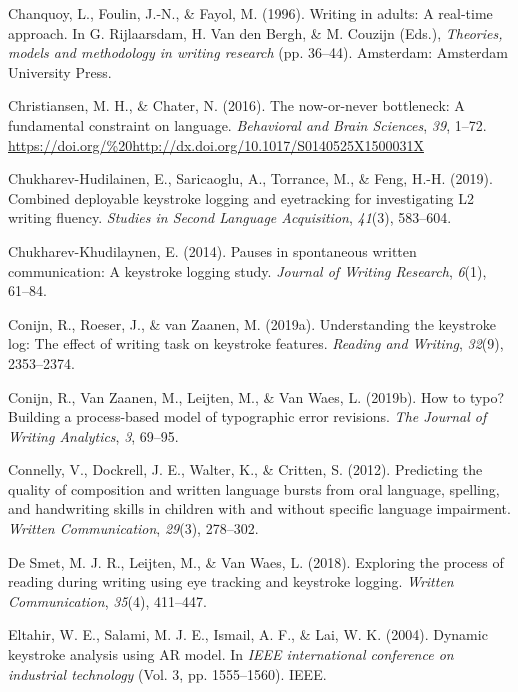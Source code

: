 \documentclass[
  english,
  man,mask,floatsintext]{apa7}
\newlength{\cslhangindent}
\newenvironment{cslreferences}%
  {\setlength{\parindent}{0pt}%
  \everypar{\setlength{\hangindent}{\cslhangindent}}\ignorespaces}%
  {\par}
\begin{document}
\begin{cslreferences}
\leavevmode\hypertarget{ref-chanquoy1996writing}{}%
Chanquoy, L., Foulin, J.-N., \& Fayol, M. (1996). Writing in adults: A real-time approach. In G. Rijlaarsdam, H. Van den Bergh, \& M. Couzijn (Eds.), \emph{Theories, models and methodology in writing research} (pp. 36--44). Amsterdam: Amsterdam University Press.

\leavevmode\hypertarget{ref-christiansen2016now}{}%
Christiansen, M. H., \& Chater, N. (2016). The now-or-never bottleneck: A fundamental constraint on language. \emph{Behavioral and Brain Sciences}, \emph{39}, 1--72. \url{https://doi.org/\%20http://dx.doi.org/10.1017/S0140525X1500031X}

\leavevmode\hypertarget{ref-chukharev2019combined}{}%
Chukharev-Hudilainen, E., Saricaoglu, A., Torrance, M., \& Feng, H.-H. (2019). Combined deployable keystroke logging and eyetracking for investigating L2 writing fluency. \emph{Studies in Second Language Acquisition}, \emph{41}(3), 583--604.

\leavevmode\hypertarget{ref-chukharev2014pauses}{}%
Chukharev-Khudilaynen, E. (2014). Pauses in spontaneous written communication: A keystroke logging study. \emph{Journal of Writing Research}, \emph{6}(1), 61--84.

\leavevmode\hypertarget{ref-conijn2019understanding}{}%
Conijn, R., Roeser, J., \& van Zaanen, M. (2019a). Understanding the keystroke log: The effect of writing task on keystroke features. \emph{Reading and Writing}, \emph{32}(9), 2353--2374.

\leavevmode\hypertarget{ref-conijn2019typo}{}%
Conijn, R., Van Zaanen, M., Leijten, M., \& Van Waes, L. (2019b). How to typo? Building a process-based model of typographic error revisions. \emph{The Journal of Writing Analytics}, \emph{3}, 69--95.

\leavevmode\hypertarget{ref-connelly2012predicting}{}%
Connelly, V., Dockrell, J. E., Walter, K., \& Critten, S. (2012). Predicting the quality of composition and written language bursts from oral language, spelling, and handwriting skills in children with and without specific language impairment. \emph{Written Communication}, \emph{29}(3), 278--302.

\leavevmode\hypertarget{ref-de2018exploring}{}%
De Smet, M. J. R., Leijten, M., \& Van Waes, L. (2018). Exploring the process of reading during writing using eye tracking and keystroke logging. \emph{Written Communication}, \emph{35}(4), 411--447.

\leavevmode\hypertarget{ref-eltahir2004dynamic}{}%
Eltahir, W. E., Salami, M. J. E., Ismail, A. F., \& Lai, W. K. (2004). Dynamic keystroke analysis using AR model. In \emph{IEEE international conference on industrial technology} (Vol. 3, pp. 1555--1560). IEEE.


\end{cslreferences}
\end{document}
